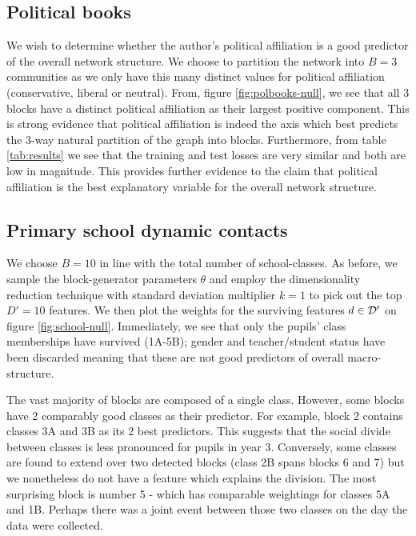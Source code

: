 \subsection{Political books}

We wish to determine whether the author's political affiliation is a good predictor of the overall network structure. We choose to partition the network into $B=3$ communities as we only have this many distinct values for political affiliation (conservative, liberal or neutral). From, figure \ref{fig:polbooks-null}, we see that all 3 blocks have a distinct political affiliation as their largest positive component. This is strong evidence that political affiliation is indeed the axis which best predicts the 3-way natural partition of the graph into blocks. Furthermore, from table \ref{tab:results} we see that the training and test losses are very similar and both are low in magnitude. This provides further evidence to the claim that political affiliation is the best explanatory variable for the overall network structure.

\subsection{Primary school dynamic contacts}

We choose $B=10$ in line with the total number of school-classes. As before, we sample the block-generator parameters $\theta$ and employ the dimensionality reduction technique with standard deviation multiplier $k=1$ to pick out the top $D'=10$ features. We then plot the weights for the surviving features $d \in \mathcal{D}'$ on figure \ref{fig:school-null}. Immediately, we see that only the pupils' class memberships have survived (1A-5B); gender and teacher/student status have been discarded meaning that these are not good predictors of overall macro-structure.

The vast majority of blocks are composed of a single class. However, some blocks have 2 comparably good classes as their predictor. For example, block 2 contains classes 3A and 3B as its 2 best predictors. This suggests that the social divide between classes is less pronounced for pupils in year 3. Conversely, some classes are found to extend over two detected blocks (class 2B spans blocks 6 and 7) but we nonetheless do not have a feature which explains the division. The most surprising block is number 5 - which has comparable weightings for classes 5A and 1B. Perhaps there was a joint event between those two classes on the day the data were collected.

